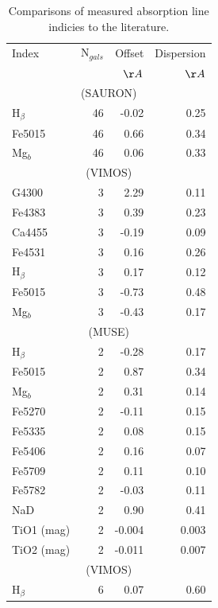 	\begin{table}
	\begin{threeparttable}
		\centering
		\caption{Comparisons of measured absorption line indicies to the literature.}
		\label{tab:litAbsorption}
		\begin{tabular}{l r r r}
			\hline
			\hline
			Index 		& N$_{gals}$ & Offset 	& Dispersion \\
						& 			& $\AA$		& $\AA$ \\
			\hline
			\multicolumn{4}{c}{\citet{Vazdekis2010} (SAURON)} \\
			\hline
			H$_\beta$ 	& 46		& -0.02		& 0.25	\\
			Fe5015		& 46		& 0.66		& 0.34	\\
			Mg$_b$ 		& 46		& 0.06		& 0.33	\\
			\hline
			\multicolumn{4}{c}{\citet{Rampazzo2005} (VIMOS)} \\
			\hline
			G4300 		& 3 		& 2.29		& 0.11	\\
			Fe4383 		& 3 		& 0.39		& 0.23	\\
			Ca4455 		& 3 		& -0.19		& 0.09	\\
			Fe4531 		& 3 		& 0.16		& 0.26	\\
			H$_\beta$ 	& 3 		& 0.17		& 0.12	\\
			Fe5015 		& 3 		& -0.73		& 0.48	\\
			Mg$_b$ 		& 3 		& -0.43		& 0.17	\\
			\hline
			\multicolumn{4}{c}{\citet{Rampazzo2005} (MUSE)} \\
			\hline
			H$_\beta$ 	& 2 		& -0.28		& 0.17	\\ 
			Fe5015 		& 2 		& 0.87		& 0.34	\\ 
			Mg$_b$ 		& 2 		& 0.31		& 0.14	\\
			Fe5270 		& 2 		& -0.11		& 0.15	\\
			Fe5335 		& 2 		& 0.08		& 0.15	\\
			Fe5406 		& 2 		& 0.16		& 0.07	\\
			Fe5709 		& 2 		& 0.11		& 0.10	\\
			Fe5782 		& 2 		& -0.03		& 0.11	\\
			NaD 		& 2 		& 0.90		& 0.41	\\
			TiO1 (mag)	& 2 		& -0.004	& 0.003	\\
			TiO2 (mag)	& 2 		& -0.011	& 0.007	\\
			\hline
			\multicolumn{4}{c}{\citet{Ogando2008} (VIMOS)} \\
			\hline
			H$_\beta$ 	& 6 		& 0.07		& 0.60	\\

\end{tabular}
\end{threeparttable}
\end{table}
